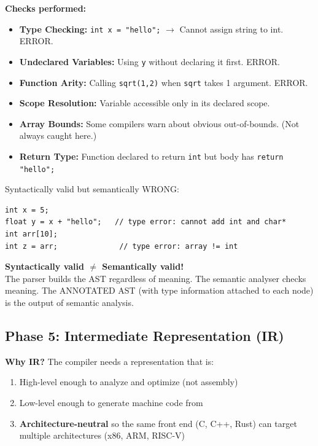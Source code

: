 \documentclass[11pt,a4paper]{article}
\newcommand{\code}[1]{\texttt{\small\colorbox{codebg}{\color{codekw}#1}}}
\newcommand{\term}[1]{\textbf{\color{darkblue}#1}}
\begin{document}
\textbf{Checks performed:}
\begin{itemize}[noitemsep]
  \item \term{Type Checking:} \code{int x = "hello";} $\to$ Cannot assign string to int. ERROR.
  \item \term{Undeclared Variables:} Using \code{y} without declaring it first. ERROR.
  \item \term{Function Arity:} Calling \code{sqrt(1,2)} when \code{sqrt} takes 1 argument. ERROR.
  \item \term{Scope Resolution:} Variable accessible only in its declared scope.
  \item \term{Array Bounds:} Some compilers warn about obvious out-of-bounds. (Not always caught here.)
  \item \term{Return Type:} Function declared to return \code{int} but body has \code{return "hello";}
\end{itemize}

\begin{myexample}
Syntactically valid but semantically WRONG:
\begin{lstlisting}
int x = 5;
float y = x + "hello";   // type error: cannot add int and char*
int arr[10];
int z = arr;              // type error: array != int
\end{lstlisting}
\end{myexample}

\begin{important}
\textbf{Syntactically valid $\neq$ Semantically valid!}\\
The parser builds the AST regardless of meaning. The semantic analyser checks meaning.
The ANNOTATED AST (with type information attached to each node) is the output of semantic analysis.
\end{important}

\subsection{Phase 5: Intermediate Representation (IR)}

\textbf{Why IR?} The compiler needs a representation that is:
\begin{enumerate}[noitemsep]
  \item High-level enough to analyze and optimize (not assembly)
  \item Low-level enough to generate machine code from
  \item \textbf{Architecture-neutral} so the same front end (C, C++, Rust) can target multiple architectures (x86, ARM, RISC-V)
\end{enumerate}
\end{document}
